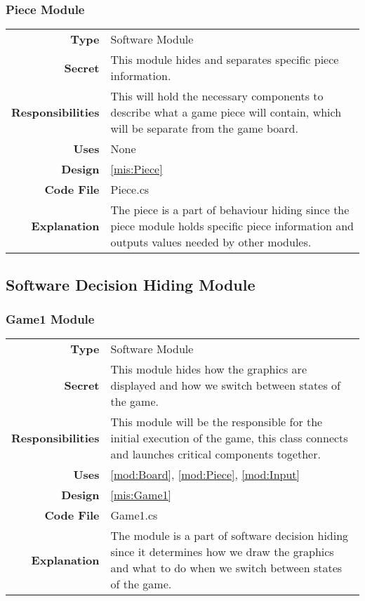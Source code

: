 \documentclass[10pt]{article}
\makeatletter
\newcommand{\CustomLabel}[1]{\Hy@raisedlink{\hypertarget{#1}{}}\label{#1}}
\makeatother
\begin{document}
    \subsubsection{Piece Module}\CustomLabel{mod:Piece}
        \begin{tabularx}{\linewidth}{ >{\bfseries}r X }
            Type            & Software Module \\
            Secret          & This module hides and separates specific piece information. \\
            Responsibilities & This will hold the necessary components to describe what a game piece will contain, which will be separate from the game board. \\
            Uses            & None \\
            Design          & \ref{mis:Piece} \\
            Code File       & Piece.cs \\
            Explanation     & The piece is a part of behaviour hiding since the piece module holds specific piece information and outputs values needed by other modules. \\
        \end{tabularx}

\subsection{Software Decision Hiding Module}

    \subsubsection{Game1 Module}\CustomLabel{mod:Game1}
        \begin{tabularx}{\linewidth}{ >{\bfseries}r X }
            Type            & Software Module \\
            Secret          & This module hides how the graphics are displayed and how we switch between states of the game. \\
            Responsibilities & This module will be the responsible for the initial execution of the game, this class connects and launches critical components together. \\
            Uses            & \ref{mod:Board}, \ref{mod:Piece}, \ref{mod:Input} \\
            Design          & \ref{mis:Game1} \\
            Code File       & Game1.cs \\
            Explanation     & The module is a part of software decision hiding since it determines how we draw the graphics and what to do when we switch between states of the game. \\
        \end{tabularx}
        
\end{document}
